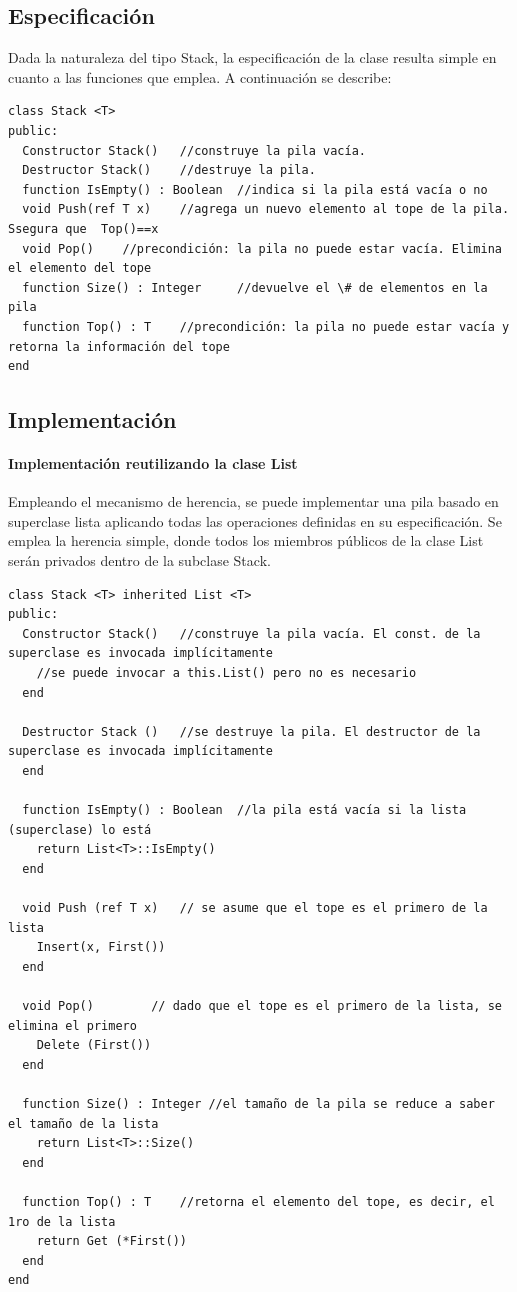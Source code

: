 \subsection{Especificación}

Dada la naturaleza del tipo Stack, la especificación de la clase resulta simple en cuanto a las funciones que emplea. A continuación se describe:

\begin{lstlisting}[upquote=true, language=pseudo]
class Stack <T>
public:
  Constructor Stack()	//construye la pila vacía.
  Destructor Stack()	//destruye la pila.
  function IsEmpty() : Boolean	//indica si la pila está vacía o no
  void Push(ref T x)	//agrega un nuevo elemento al tope de la pila. Ssegura que  Top()==x
  void Pop()	//precondición: la pila no puede estar vacía. Elimina el elemento del tope
  function Size() : Integer		//devuelve el \# de elementos en la pila
  function Top() : T	//precondición: la pila no puede estar vacía y retorna la información del tope
end
\end{lstlisting}

\subsection{Implementación}

\paragraph{Implementación reutilizando la clase List}

Empleando el mecanismo de herencia, se puede implementar una pila basado en superclase lista aplicando todas las operaciones definidas en su especificación. Se emplea la herencia simple, donde todos los miembros públicos de la clase List serán privados dentro de la subclase Stack. 

\begin{lstlisting}[upquote=true, language=pseudo]
class Stack <T> inherited List <T>
public:
  Constructor Stack()	//construye la pila vacía. El const. de la superclase es invocada implícitamente
    //se puede invocar a this.List() pero no es necesario
  end

  Destructor Stack ()	//se destruye la pila. El destructor de la superclase es invocada implícitamente
  end

  function IsEmpty() : Boolean	//la pila está vacía si la lista (superclase) lo está
    return List<T>::IsEmpty()
  end

  void Push (ref T x)	// se asume que el tope es el primero de la lista
    Insert(x, First())
  end

  void Pop()		// dado que el tope es el primero de la lista, se elimina el primero
    Delete (First())
  end

  function Size() : Integer	//el tamaño de la pila se reduce a saber el tamaño de la lista
    return List<T>::Size()
  end

  function Top() : T	//retorna el elemento del tope, es decir, el 1ro de la lista
    return Get (*First())
  end
end
\end{lstlisting}

